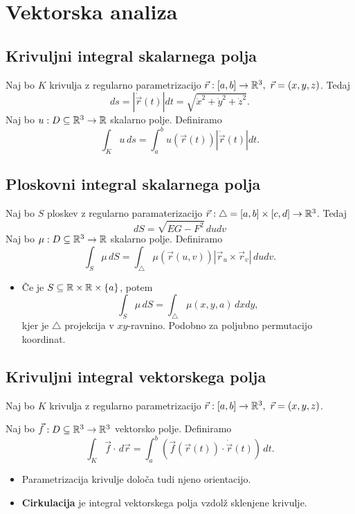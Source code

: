 \section{Vektorska analiza}
\subsection{Krivuljni integral skalarnega polja}
Naj bo \(K\) krivulja z regularno parametrizacijo \(\vec{r}: [a,b] \to \mathbb{R}^3, \ \vec{r} = (x, y, z)\). Tedaj 
\[
    ds = |\dot{\vec{r}}(t)| dt = \sqrt{\dot{x}^2 + \dot{y}^2 + \dot{z}^2}.
\]
Naj bo \(u: D \subseteq \mathbb{R}^3 \to \mathbb{R}\) skalarno polje. Definiramo 
\[
    \int_{K} u \, ds = \int_{a}^{b} u(\vec{r}(t)) |\dot{\vec{r}}(t)| dt.
\]

\subsection{Ploskovni integral skalarnega polja}
Naj bo \(S\) ploskev z regularno paramaterizacijo \(\vec{r}: \triangle = [a, b] \times [c,d] \to \mathbb{R}^3\).  Tedaj
\[
    dS = \sqrt{EG-F^2} \, dudv
\]
Naj bo \(\mu: D \subseteq \mathbb{R}^3 \to \mathbb{R}\) skalarno polje. Definiramo 
\[
    \int_{S} \mu \, dS = \int_{\triangle} \mu(\vec{r}(u, v)) |\vec{r}_u \times \vec{r}_v| \, dudv.
\]

\begin{itemize}
    \item Če je \(S \subseteq \mathbb{R} \times \mathbb{R} \times \{a\}\), potem 
    \[
        \int_{S} \mu \, dS = \int_{\triangle} \mu(x,y,a) \, dxdy,
    \]
    kjer je \(\triangle\) projekcija v \(xy\)-ravnino. Podobno za poljubno permutacijo koordinat.
\end{itemize}

\subsection{Krivuljni integral vektorskega polja}
Naj bo \(K\) krivulja z regularno parametrizacijo \(\vec{r}: [a,b] \to \mathbb{R}^3, \ \vec{r} = (x, y, z)\). 

Naj bo \(\vec{f}: D \subseteq \mathbb{R}^3 \to \mathbb{R}^3\) vektorsko polje. Definiramo 
\[
    \int_{K} \vec{f} \cdot \, d\vec{r} = \int_{a}^{b} (\vec{f}(\vec{r}(t)) \cdot \dot{\vec{r}}(t)) \, dt.
\]

\begin{itemize}
    \item Parametrizacija krivulje določa tudi njeno orientacijo.
    \item \textbf{Cirkulacija} je integral vektorskega polja vzdolž sklenjene krivulje.
\end{itemize}

